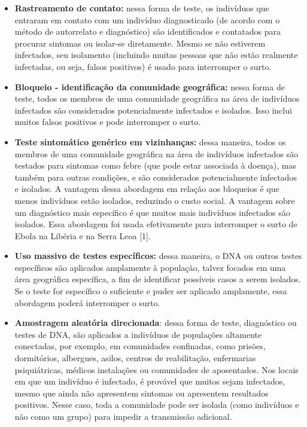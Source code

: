 \documentclass[onecolumn,journal]{IEEEtran}
\begin{document}
\begin{multicols}{2}
\begin{itemize}
    \item \textbf{Rastreamento de contato:} nessa forma de teste, os indivíduos que entraram em contato com um indivíduo diagnosticado (de acordo com o método de autorrelato e diagnóstico) são identificados e contatados para procurar sintomas ou isolar-se diretamente. Mesmo se não estiverem infectados, seu isolamento (incluindo muitas pessoas que não estão realmente infectadas, ou seja, falsos positivos) é usado para interromper o surto.

    \item \textbf{Bloqueio - identificação da comunidade geográfica:} nessa forma de teste, todos os membros de uma comunidade geográfica na área de indivíduos infectados são considerados potencialmente infectados e isolados. Isso inclui muitos falsos positivos e pode interromper o surto.
    
    \item \textbf{Teste sintomático genérico em vizinhanças:} dessa maneira, todos os membros de uma comunidade geográfica na área de indivíduos infectados são testados para sintomas como febre (que pode estar associada à doença), mas também para outras condições, e são considerados potencialmente infectados e isolados. A vantagem dessa abordagem em relação aos bloqueios é que menos indivíduos estão isolados, reduzindo o custo social. A vantagem sobre um diagnóstico mais específico é que muitos mais indivíduos infectados são isolados. Essa abordagem foi usada efetivamente para interromper o surto de Ebola na Libéria e na Serra Leoa [1].
    
    \item \textbf{Uso massivo de testes específicos:} dessa maneira, o DNA ou outros testes específicos são aplicados amplamente à população, talvez focados em uma área geográfica específica, a fim de identificar possíveis casos a serem isolados. Se o teste for específico o suficiente e puder ser aplicado amplamente, essa abordagem poderá interromper o surto.
    
    \item \textbf{Amostragem aleatória direcionada}: dessa forma de teste, diagnóstico ou testes de DNA, são aplicados a indivíduos de populações altamente conectadas, por exemplo, em comunidades confinadas, como prisões, dormitórios, albergues, asilos, centros de reabilitação, enfermarias psiquiátricas, médicos instalações ou comunidades de aposentados. Nos locais em que um indivíduo é infectado, é provável que muitos sejam infectados, mesmo que ainda não apresentem sintomas ou apresentem resultados positivos. Nesse caso, toda a comunidade pode ser isolada (como indivíduos e não como um grupo) para impedir a transmissão adicional.
\end{itemize}


\end{multicols}
\end{document}
